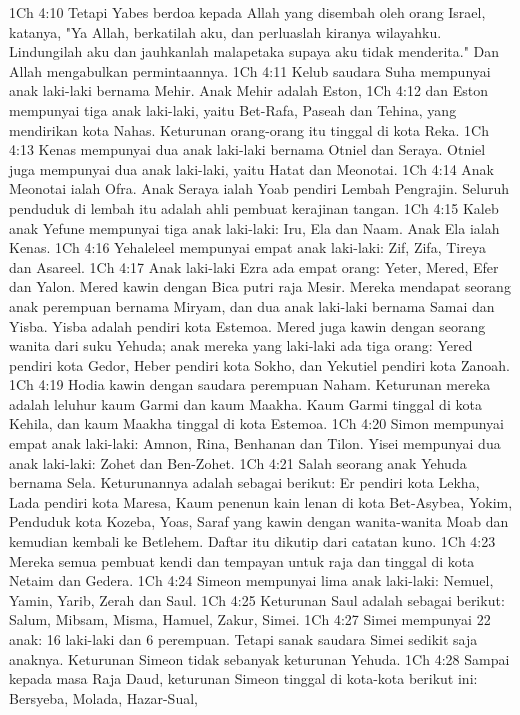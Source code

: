 1Ch 4:10  Tetapi Yabes berdoa kepada Allah yang disembah oleh orang Israel, katanya, "Ya Allah, berkatilah aku, dan perluaslah kiranya wilayahku. Lindungilah aku dan jauhkanlah malapetaka supaya aku tidak menderita." Dan Allah mengabulkan permintaannya.
1Ch 4:11  Kelub saudara Suha mempunyai anak laki-laki bernama Mehir. Anak Mehir adalah Eston,
1Ch 4:12  dan Eston mempunyai tiga anak laki-laki, yaitu Bet-Rafa, Paseah dan Tehina, yang mendirikan kota Nahas. Keturunan orang-orang itu tinggal di kota Reka.
1Ch 4:13  Kenas mempunyai dua anak laki-laki bernama Otniel dan Seraya. Otniel juga mempunyai dua anak laki-laki, yaitu Hatat dan Meonotai.
1Ch 4:14  Anak Meonotai ialah Ofra. Anak Seraya ialah Yoab pendiri Lembah Pengrajin. Seluruh penduduk di lembah itu adalah ahli pembuat kerajinan tangan.
1Ch 4:15  Kaleb anak Yefune mempunyai tiga anak laki-laki: Iru, Ela dan Naam. Anak Ela ialah Kenas.
1Ch 4:16  Yehaleleel mempunyai empat anak laki-laki: Zif, Zifa, Tireya dan Asareel.
1Ch 4:17  Anak laki-laki Ezra ada empat orang: Yeter, Mered, Efer dan Yalon. Mered kawin dengan Bica putri raja Mesir. Mereka mendapat seorang anak perempuan bernama Miryam, dan dua anak laki-laki bernama Samai dan Yisba. Yisba adalah pendiri kota Estemoa. Mered juga kawin dengan seorang wanita dari suku Yehuda; anak mereka yang laki-laki ada tiga orang: Yered pendiri kota Gedor, Heber pendiri kota Sokho, dan Yekutiel pendiri kota Zanoah.
1Ch 4:19  Hodia kawin dengan saudara perempuan Naham. Keturunan mereka adalah leluhur kaum Garmi dan kaum Maakha. Kaum Garmi tinggal di kota Kehila, dan kaum Maakha tinggal di kota Estemoa.
1Ch 4:20  Simon mempunyai empat anak laki-laki: Amnon, Rina, Benhanan dan Tilon. Yisei mempunyai dua anak laki-laki: Zohet dan Ben-Zohet.
1Ch 4:21  Salah seorang anak Yehuda bernama Sela. Keturunannya adalah sebagai berikut: Er pendiri kota Lekha, Lada pendiri kota Maresa, Kaum penenun kain lenan di kota Bet-Asybea, Yokim, Penduduk kota Kozeba, Yoas, Saraf yang kawin dengan wanita-wanita Moab dan kemudian kembali ke Betlehem. Daftar itu dikutip dari catatan kuno.
1Ch 4:23  Mereka semua pembuat kendi dan tempayan untuk raja dan tinggal di kota Netaim dan Gedera.
1Ch 4:24  Simeon mempunyai lima anak laki-laki: Nemuel, Yamin, Yarib, Zerah dan Saul.
1Ch 4:25  Keturunan Saul adalah sebagai berikut: Salum, Mibsam, Misma, Hamuel, Zakur, Simei.
1Ch 4:27  Simei mempunyai 22 anak: 16 laki-laki dan 6 perempuan. Tetapi sanak saudara Simei sedikit saja anaknya. Keturunan Simeon tidak sebanyak keturunan Yehuda.
1Ch 4:28  Sampai kepada masa Raja Daud, keturunan Simeon tinggal di kota-kota berikut ini: Bersyeba, Molada, Hazar-Sual,
